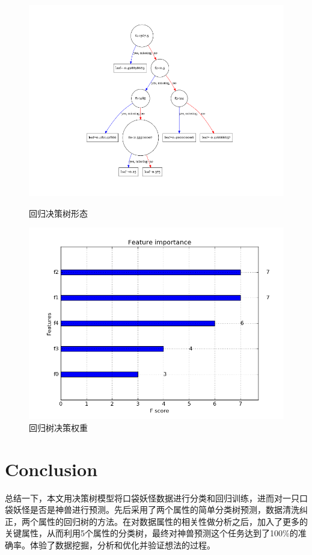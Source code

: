 \documentclass[a4paper, cs4size, oneside]{article}
\begin{document}
\begin{figure}
\begin{minipage}[htb]{0.5\linewidth}
\centering
\includegraphics[width=0.9\linewidth]{figures/decision_tree3.png}
\caption{回归决策树形态}
\label{fig:side:decistion_tree3}
\end{minipage}%
\begin{minipage}[htb]{0.5\linewidth}
\centering
\includegraphics[width=0.9\linewidth]{figures/importance3.png}
\caption{回归树决策权重}
\label{fig:side:importance3}
\end{minipage}
\end{figure}


\section{Conclusion}
总结一下，本文用决策树模型将口袋妖怪数据进行分类和回归训练，进而对一只口袋妖怪是否是神兽进行预测。先后采用了两个属性的简单分类树预测，数据清洗纠正，两个属性的回归树的方法。在对数据属性的相关性做分析之后，加入了更多的关键属性，从而利用5个属性的分类树，最终对神兽预测这个任务达到了100\%的准确率。体验了数据挖掘，分析和优化并验证想法的过程。



\newpage


\renewcommand\refname{Reference}



\clearpage

% 
\end{document}

